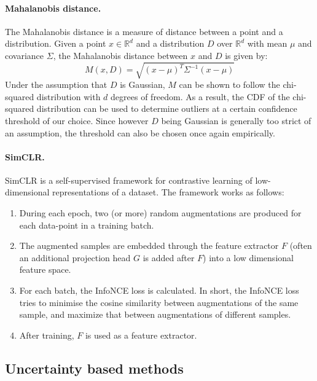 \documentclass[a4paper,10pt]{article}
\newcommand{\R}{\mathbb{R}}
\begin{document}
\paragraph{Mahalanobis distance.} The Mahalanobis distance \cite{mahalanobis} is a measure of distance between a point and a distribution. Given a point $x\in\R^d$ and a distribution $D$ over $\R^d$ with mean $\mu$ and covariance $\Sigma$, the Mahalanobis distance between $x$ and $D$ is given by:
\[
	M(x, D) = \sqrt{(x-\mu)^T\Sigma^{-1}(x-\mu)}
\]
Under the assumption that $D$ is Gaussian, $M$ can be shown to follow the chi-squared distribution with $d$ degrees of freedom. As a result, the CDF of the chi-squared distribution can be used to determine outliers at a certain confidence threshold of our choice. Since however $D$ being Gaussian is generally too strict of an assumption, the threshold can also be chosen once again empirically.

\paragraph{SimCLR.} SimCLR \cite{simclr} is a self-supervised framework for contrastive learning of low-dimensional representations of a dataset. The framework works as follows:
\begin{enumerate}
	\item During each epoch, two (or more) random augmentations are produced for each data-point in a training batch.
	\item The augmented samples are embedded through the feature extractor $F$ (often an additional projection head $G$ is added after $F$) into a low dimensional feature space.
	\item For each batch, the InfoNCE loss \cite{infonce} is calculated. In short, the InfoNCE loss tries to minimise the cosine similarity between augmentations of the same sample, and maximize that between augmentations of different samples.
	\item After training, $F$ is used as a feature extractor.
\end{enumerate}


\subsection{Uncertainty based methods}
\label{sec:un_method}
\end{document}
